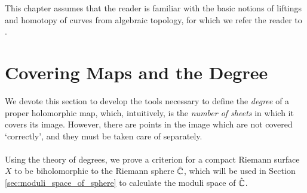 \documentclass[../Moduli_Spaces_of_Riemann_Surfaces.tex]{subfiles}
\begin{document}
    This chapter assumes that the reader is familiar with the basic notions of liftings and homotopy of curves from algebraic topology, for which we refer the reader to \cite[][Chapter 1]{hatcher}.
    \section{Covering Maps and the Degree}
    We devote this section to develop the tools necessary to define the \textit{degree} of a proper holomorphic map, which, intuitively, is the \textit{number of sheets} in which it covers its image. However, there are points in the image which are not covered `correctly', and they must be taken care of separately.\\\ \\
    Using the theory of degrees, we prove a criterion for a compact Riemann surface $X$ to be biholomorphic to the Riemann sphere $\hat{\mathbb{C}}$, which will be used in Section \ref{sec:moduli_space_of_sphere} to calculate the moduli space of $\hat{\mathbb{C}}$.
\end{document}
